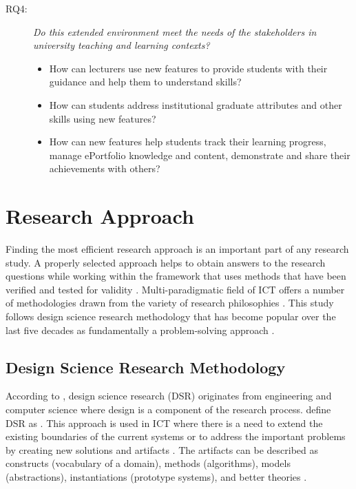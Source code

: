 \begin{description}
	\item[RQ4:] \textit{Do this extended environment meet the needs of the
	stakeholders in university teaching and learning contexts?}
	\begin{itemize}
		\item How can lecturers use new features to provide students with their
guidance and help them to understand \LLLs skills?
		\item How can students address institutional graduate attributes and other
		skills using new features?
		\item How can new features help students track their learning progress, manage
ePortfolio knowledge and content, demonstrate and share their achievements
with others?
	\end{itemize}
\end{description}

\section{Research Approach}
\label{sec:method}

Finding the most efficient research approach is an important part of any
research study. A properly selected approach helps to obtain answers to the
research questions while working within the framework that uses methods that
have been verified and tested for validity \citep{Kumar2005}. Multi-paradigmatic
field of ICT offers a number of methodologies drawn from the variety of research
philosophies \citep{Vaishnavi2007}. This study follows design science research
methodology that has become popular over the last five decades as fundamentally
a problem-solving approach \citep{Cross1993}.

\subsection{Design Science Research Methodology}

According to \citet{Peffers2008}, design science research (DSR) originates from
engineering and computer science where design is a component of the research
process. \citet{Iivari2009} define DSR as . This approach is used in ICT where there is a need to extend the
existing boundaries of the current systems or to address the important problems
by creating new solutions and artifacts \citep{Hevner2004}. The artifacts can be
described as constructs (vocabulary of a domain), methods (algorithms), models
(abstractions), instantiations (prototype systems), and better theories
\citep{Hevner2010}.

